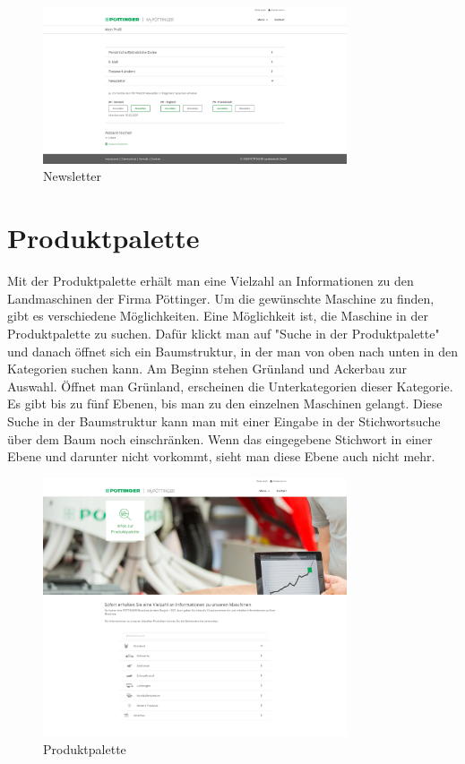 \begin{figure}[H]
	\centerline{
		\includegraphics[width=0.8\textwidth]{./grafiken/erm_profil_newsletter.png}
	}
	\vskip0pt
	\caption{Newsletter} \label{fig:newsletter}
\end{figure}

\section{Produktpalette}

Mit der Produktpalette erhält man eine Vielzahl an Informationen zu den Landmaschinen der Firma Pöttinger. Um die gewünschte Maschine zu finden, gibt es verschiedene Möglichkeiten. Eine Möglichkeit ist, die Maschine in der Produktpalette zu suchen. Dafür klickt man auf "Suche in der Produktpalette" und danach öffnet sich ein Baumstruktur, in der man von oben nach unten in den Kategorien suchen kann. Am Beginn stehen Grünland und Ackerbau zur Auswahl. Öffnet man Grünland, erscheinen die Unterkategorien dieser Kategorie. Es gibt bis zu fünf Ebenen, bis man zu den einzelnen Maschinen gelangt. Diese Suche in der Baumstruktur kann man mit einer Eingabe in der Stichwortsuche über dem Baum noch einschränken. Wenn das eingegebene Stichwort in einer Ebene und darunter nicht vorkommt, sieht man diese Ebene auch nicht mehr.

\begin{figure}[H]
	\centerline{
		\includegraphics[width=0.8\textwidth]{./grafiken/erm_produktpalette.png}
	}
	\vskip0pt
	\caption{Produktpalette} \label{fig:produktpalette}
\end{figure}

